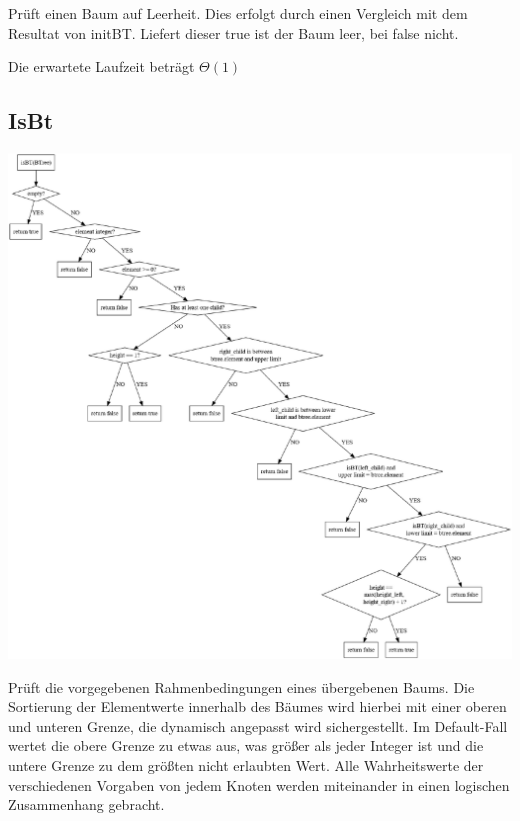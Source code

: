 \documentclass[11pt]{article}
\begin{document}
    Prüft einen Baum auf Leerheit.
    Dies erfolgt durch einen Vergleich mit dem Resultat von
    initBT. Liefert dieser true ist der Baum leer, bei false
    nicht.

    Die erwartete Laufzeit beträgt
    \begin{math}
        \Theta(1)
    \end{math}

    \subsection{IsBt}\label{subsec:isbt}

    \begin{center}
        \includegraphics[width=1.2\columnwidth] {isbt.pdf}
    \end{center}

    Prüft die vorgegebenen Rahmenbedingungen eines übergebenen Baums.
    Die Sortierung der Elementwerte innerhalb des Bäumes wird hierbei mit einer oberen und unteren Grenze, die dynamisch angepasst wird sichergestellt. Im Default-Fall wertet die obere Grenze zu etwas aus, was größer als jeder Integer ist und die untere Grenze zu dem größten nicht erlaubten Wert.
    Alle Wahrheitswerte der verschiedenen
    Vorgaben von jedem Knoten werden miteinander in einen logischen
    Zusammenhang gebracht.
\end{document}
